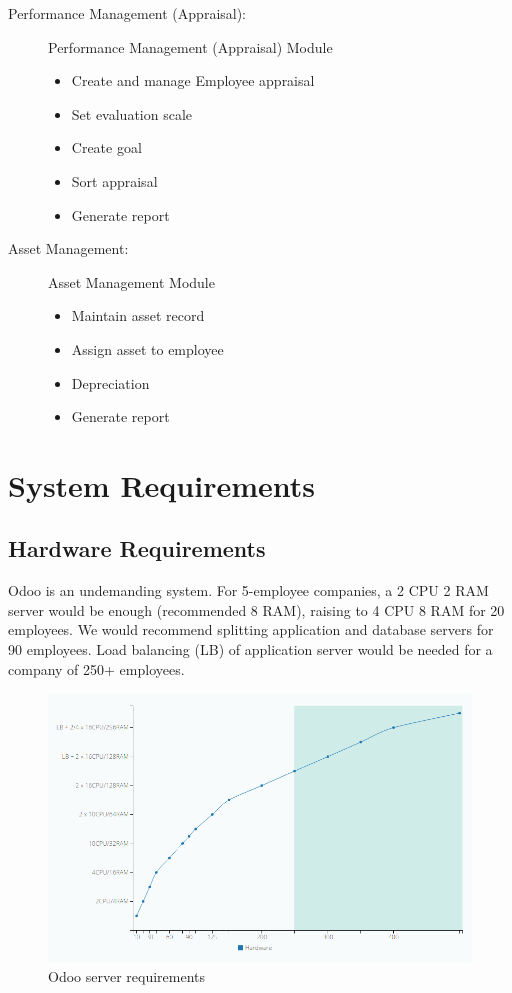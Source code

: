 \begin{description}
 	\item[Performance Management (Appraisal):] Performance Management (Appraisal) Module
	\begin{itemize}
		\item Create and manage Employee appraisal 
		\item Set evaluation scale
		\item Create goal
		\item Sort appraisal
		\item Generate report
 	\end{itemize}
 	
 	\item[Asset Management:] Asset Management Module
	\begin{itemize}
		\item Maintain asset record 
		\item Assign asset to employee
		\item Depreciation
		\item Generate report
 	\end{itemize}
\end{description}


\section{System Requirements}

\subsection{Hardware Requirements}

Odoo is an undemanding system. For 5-employee companies, a 2 CPU 2 RAM server would be enough (recommended 8 RAM), raising to 4 CPU 8 RAM for 20 employees. We would recommend splitting application and database servers for 90 employees. Load balancing (LB) of application server would be needed for a company of 250+ employees.

\begin{figure}[!ht]
\center
\includegraphics[width=15cm,keepaspectratio]{images/odoo_server_requirments_graph.png}
\caption{Odoo server requirements}
\label{pre-production-fig}
\end{figure}

